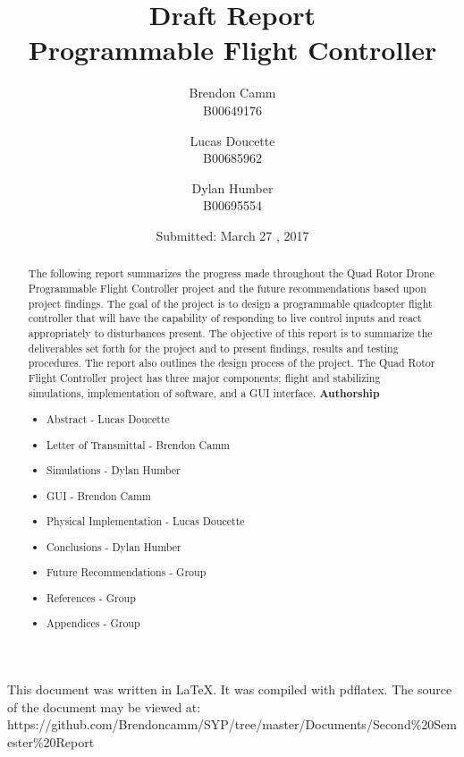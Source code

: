 \documentclass[12pt,letterpaper,titlepage]{article}
\title{Draft Report \\ Programmable Flight Controller}
\author{Brendon Camm \\ B00649176 \and Lucas Doucette \\ B00685962 \and Dylan Humber \\ B00695554}
\date{Submitted: March 27 , 2017}
\begin{document}
	\maketitle
	\newpage
	\vspace*{2in}
	This document was written in \LaTeX.  It was compiled with pdflatex.  The source of the document may be viewed at: \newline\small	https://github.com/Brendoncamm/SYP/tree/master/Documents/Second\%20Semester\%20Report
	\vspace*{4in}
	\pagebreak


	\newpage
	\begin{abstract} %
	The following report summarizes the progress made throughout the Quad Rotor Drone Programmable Flight Controller project and the future recommendations based upon project findings. The goal of the project is to design a programmable quadcopter flight controller that will have the capability of responding to live control inputs and react appropriately to disturbances present. The objective of this report is to summarize the deliverables set forth for the project and to present findings, results and testing procedures. The report also outlines the design process of the project. The Quad Rotor Flight Controller project has three major components; flight and stabilizing simulations, implementation of software, and a GUI interface.  	
	\textbf{Authorship}
	\begin{itemize}
		\itemsep-.5em
		\item{Abstract - Lucas Doucette}
		\item{Letter of Transmittal - Brendon Camm}
		\item{Simulations - Dylan Humber}
		\item{GUI - Brendon Camm}
		\item{Physical Implementation - Lucas Doucette}
		\item{Conclusions - Dylan Humber}
		\item{Future Recommendations - Group}
		\item{References - Group}
		\item{Appendices - Group}
	\end{itemize}
	
	\end{abstract}
	\setcounter{tocdepth}{2}
	\tableofcontents
	\pagebreak
	
	
\end{document}
